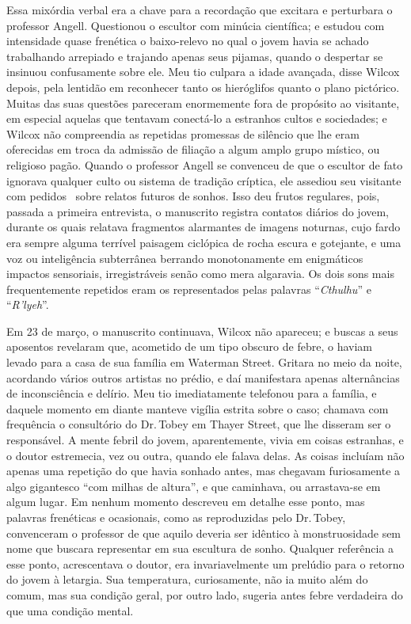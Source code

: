 Essa mixórdia verbal era a chave para a recordação que excitara e
perturbara o professor Angell. Questionou o escultor com minúcia
científica; e estudou com intensidade quase frenética o baixo-relevo no
qual o jovem havia se achado trabalhando arrepiado e trajando apenas
seus pijamas, quando o despertar se insinuou confusamente sobre ele. Meu
tio culpara a idade avançada, disse Wilcox depois, pela lentidão em
reconhecer tanto os hieróglifos quanto o plano pictórico. Muitas das
suas questões pareceram enormemente fora de propósito ao visitante, em
especial aquelas que tentavam conectá-lo a estranhos cultos e
sociedades; e Wilcox não compreendia as repetidas promessas de silêncio
que lhe eram oferecidas em troca da admissão de filiação a algum amplo
grupo místico, ou religioso pagão. Quando o professor Angell se
convenceu de que o escultor de fato ignorava qualquer culto ou sistema
de tradição críptica, ele assediou seu visitante com pedidos \est\
sobre
relatos futuros de sonhos. Isso deu frutos regulares, pois, passada a
primeira entrevista, o manuscrito registra contatos diários do jovem,
durante os quais relatava fragmentos alarmantes de imagens noturnas,
cujo fardo era sempre alguma terrível paisagem ciclópica de rocha escura
e gotejante, e uma voz ou inteligência subterrânea berrando
monotonamente em enigmáticos impactos sensoriais, irregistráveis senão
como mera algaravia. Os dois sons mais frequentemente repetidos eram os
representados pelas palavras ``\emph{Cthulhu}'' e ``\emph{R'lyeh}''.

Em 23 de março, o manuscrito continuava, Wilcox não apareceu; e buscas a
seus aposentos revelaram que, acometido de um tipo obscuro de febre, o
haviam levado para a casa de sua família em Waterman Street. Gritara no
meio da noite, acordando vários outros artistas no prédio, e daí
manifestara apenas alternâncias de inconsciência e delírio. Meu tio
imediatamente telefonou para a família, e daquele momento em diante
manteve vigília estrita sobre o caso; chamava com frequência o
consultório do Dr.\,Tobey em Thayer Street, que lhe disseram ser o
responsável. A mente febril do jovem, aparentemente, vivia em coisas
estranhas, e o doutor estremecia, vez ou outra, quando ele falava delas.
As coisas incluíam não apenas uma repetição do que havia sonhado antes,
mas chegavam furiosamente a algo gigantesco ``com milhas de altura'', e
que caminhava, ou arrastava-se em algum lugar. Em nenhum momento
descreveu em detalhe esse ponto, mas palavras frenéticas e ocasionais,
como as reproduzidas pelo Dr.\,Tobey, convenceram o professor de que
aquilo deveria ser idêntico à monstruosidade sem nome que buscara
representar em sua escultura de sonho. Qualquer referência a esse ponto,
acrescentava o doutor, era invariavelmente um prelúdio para o retorno do
jovem à letargia. Sua temperatura, curiosamente, não ia muito além do
comum, mas sua condição geral, por outro lado, sugeria antes febre
verdadeira do que uma condição mental.


